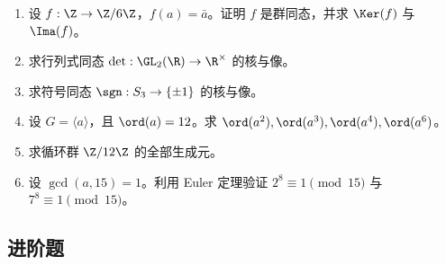 \begin{enumerate}[label=\textbf{习题6.\arabic*.}, leftmargin=7em]
  \item \basic 设 $f:\Z\to \Z/6\Z$，$f(a)=\bar a$。证明 $f$ 是群同态，并求 $\Ker(f)$ 与 $\Ima(f)$。
  \item \basic 求行列式同态 $\det:\GL_2(\R)\to \R^\times$ 的核与像。
  \item \basic 求符号同态 $\sgn:S_3\to \{\pm1\}$ 的核与像。
  \item \basic 设 $G=\langle a \rangle$，且 $\ord(a)=12$。求 $\ord(a^2),\ord(a^3),\ord(a^4),\ord(a^6)$。
  \item \basic 求循环群 $\Z/12\Z$ 的全部生成元。
  \item \basic 设 $\gcd(a,15)=1$。利用 Euler 定理验证 $2^8 \equiv1 \pmod{15}$ 与 $7^8 \equiv1 \pmod{15}$。
\end{enumerate}

\subsection*{进阶题}

